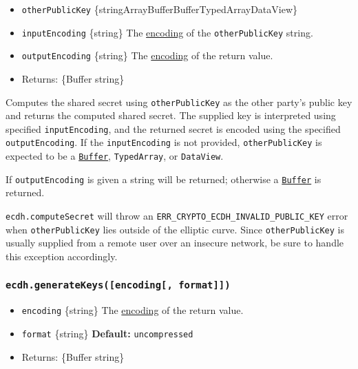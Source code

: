 \begin{itemize}
\tightlist
\item
  \texttt{otherPublicKey}
  \{string\textbar ArrayBuffer\textbar Buffer\textbar TypedArray\textbar DataView\}
\item
  \texttt{inputEncoding} \{string\} The
  \href{buffer.md\#buffers-and-character-encodings}{encoding} of the
  \texttt{otherPublicKey} string.
\item
  \texttt{outputEncoding} \{string\} The
  \href{buffer.md\#buffers-and-character-encodings}{encoding} of the
  return value.
\item
  Returns: \{Buffer \textbar{} string\}
\end{itemize}

Computes the shared secret using \texttt{otherPublicKey} as the other
party's public key and returns the computed shared secret. The supplied
key is interpreted using specified \texttt{inputEncoding}, and the
returned secret is encoded using the specified \texttt{outputEncoding}.
If the \texttt{inputEncoding} is not provided, \texttt{otherPublicKey}
is expected to be a \href{buffer.md}{\texttt{Buffer}},
\texttt{TypedArray}, or \texttt{DataView}.

If \texttt{outputEncoding} is given a string will be returned; otherwise
a \href{buffer.md}{\texttt{Buffer}} is returned.

\texttt{ecdh.computeSecret} will throw an
\texttt{ERR\_CRYPTO\_ECDH\_INVALID\_PUBLIC\_KEY} error when
\texttt{otherPublicKey} lies outside of the elliptic curve. Since
\texttt{otherPublicKey} is usually supplied from a remote user over an
insecure network, be sure to handle this exception accordingly.

\subsubsection{\texorpdfstring{\texttt{ecdh.generateKeys({[}encoding{[},\ format{]}{]})}}{ecdh.generateKeys({[}encoding{[}, format{]}{]})}}\label{ecdh.generatekeysencoding-format}

\begin{itemize}
\tightlist
\item
  \texttt{encoding} \{string\} The
  \href{buffer.md\#buffers-and-character-encodings}{encoding} of the
  return value.
\item
  \texttt{format} \{string\} \textbf{Default:}
  \texttt{\textquotesingle{}uncompressed\textquotesingle{}}
\item
  Returns: \{Buffer \textbar{} string\}
\end{itemize}

